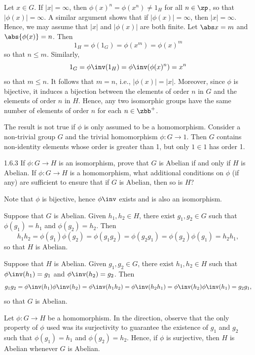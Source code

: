 \begin{sol}[spsol]
    Let $x \in G$.
    If $|x| = \infty$, then $\phi(x)^n = \phi(x^n) \neq 1_H$ for all $n \in \zp$, so that $|\phi(x)| = \infty$.
    A similar argument shows that if $|\phi(x)| = \infty$, then $|x| = \infty$.
    Hence, we may assume that $|x|$ and $|\phi(x)|$ are both finite.
	Let $\abs x = m$ and $\abs{\phi(x)} = n$.
	Then
    \[
    	1_H = \phi(1_G) = \phi(x^m) = \phi(x)^m
    \]
    so that $n \leq m$.
	Similarly,
    \[
    	1_G = \phi\inv(1_H) = \phi\inv(\phi(x)^n) = x^n
    \]
    so that $m \leq n$.
	It follows that $m = n$, i.e., $|\phi(x)| = |x|$.
	Moreover, since $\phi$ is bijective, it induces a bijection between the elements of order $n$ in $G$ and the elements of order $n$ in $H$.
	Hence, any two isomorphic groups have the same number of elements of order $n$ for each $n \in \zbb^+$.

    The result is not true if $\phi$ is only assumed to be a homomorphism. Consider a non-trivial group $G$ and the trivial homomorphism $\phi : G \to 1$. Then $G$ contains non-identity elements whose order is greater than 1, but only $1 \in 1$ has order 1.
\end{sol}

\begin{exercise}{1.6.3}
    If $\phi : G \to H$ is an isomorphism, prove that $G$ is Abelian if and only if $H$ is Abelian.
	If $\phi : G \to H$ is a homomorphism, what additional conditions on $\phi$ (if any) are sufficient to ensure that if $G$ is Abelian, then so is $H$?
\end{exercise}

\begin{sol}
    Note that $\phi$ is bijective, hence $\phi\inv$ exists and is also an isomorphism.

    \rightimp Suppose that $G$ is Abelian.
    Given $h_1, h_2 \in H$, there exist $g_1, g_2 \in G$ such that $\phi(g_1) = h_1$ and $\phi(g_2) = h_2$.
    Then
    \[
        h_1h_2 = \phi(g_1)\phi(g_2) = \phi(g_1g_2) = \phi(g_2g_1) = \phi(g_2)\phi(g_1) = h_2h_1,
    \]
    so that $H$ is Abelian.

    \leftimp Suppose that $H$ is Abelian.
    Given $g_1, g_2 \in G$, there exist $h_1, h_2 \in H$ such that $\phi\inv(h_1) = g_1$ and $\phi\inv(h_2) = g_2$.
    Then
    \[
        g_1g_2 = \phi\inv(h_1)\phi\inv(h_2) = \phi\inv(h_1h_2) = \phi\inv(h_2h_1) = \phi\inv(h_2)\phi\inv(h_1) = g_2g_1,
    \]
    so that $G$ is Abelian.
    
    Let $\phi : G \to H$ be a homomorphism.
	In the \rightimp direction, observe that the only property of $\phi$ used was its surjectivity to guarantee the existence of $g_1$ and $g_2$ such that $\phi(g_1) = h_1$ and $\phi(g_2) = h_2$.
	Hence, if $\phi$ is surjective, then $H$ is Abelian whenever $G$ is Abelian.
\end{sol}

